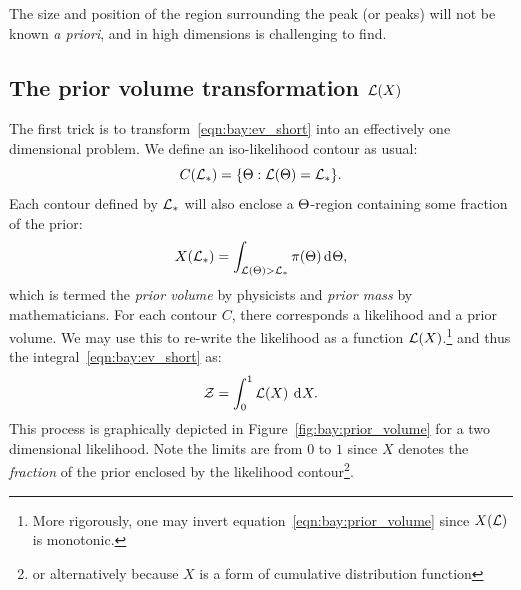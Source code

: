The size and position of the region surrounding the peak (or peaks) will not be known {\em a priori}, and in high dimensions is challenging to find.  

\subsection{The prior volume transformation $\mathcal{L}(X)$}
The first trick is to transform~\eqref{eqn:bay:ev_short} into an effectively one dimensional problem. We define an iso-likelihood contour as usual:
\begin{equation}
  C(\mathcal{L}_\ast) = \{\Theta : \mathcal{L}(\Theta)=\mathcal{L}_\ast \}.
  \label{eqn:bay:contour_def}
\end{equation}
Each contour defined by $\mathcal{L}_\ast$ will also enclose a $\Theta$-region containing some fraction of the prior:
\begin{equation}
  X(\mathcal{L}_\ast) = \int_{\mathcal{L}(\Theta)>\mathcal{L}_\ast} \pi(\Theta) \operatorname{d}^{}\!{\Theta},
  \label{eqn:bay:prior_volume}
\end{equation}
which is termed the {\em prior volume\/} by physicists and {\em prior mass\/} by mathematicians. For each contour $C$, there corresponds a likelihood and a prior volume. We may use this to re-write the likelihood as a function $\mathcal{L}(X)$.\footnote{More rigorously, one may invert equation~\protect\eqref{eqn:bay:prior_volume} since $X(\mathcal{L})$ is monotonic.} and thus the integral~\eqref{eqn:bay:ev_short} as:
\begin{equation}
  \mathcal{Z} = \int_0^1 \mathcal{L}(X)\:\operatorname{d}^{}\!{X}.
  \label{eqn:bay:ev_X}
\end{equation}
This process is graphically depicted in Figure~\ref{fig:bay:prior_volume} for a two dimensional likelihood. Note the limits are from $0$ to $1$ since $X$ denotes the {\em fraction\/} of the prior enclosed by the likelihood contour\footnote{or alternatively because $X$ is a form of cumulative distribution function}.
%
